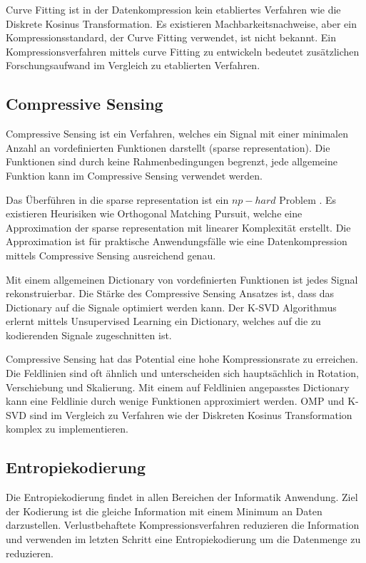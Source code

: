 Curve Fitting ist in der Datenkompression kein etabliertes Verfahren wie die Diskrete Kosinus Transformation. Es existieren Machbarkeitsnachweise, aber ein Kompressionsstandard, der Curve Fitting verwendet, ist nicht bekannt. Ein Kompressionsverfahren mittels curve Fitting zu entwickeln bedeutet zusätzlichen Forschungsaufwand im Vergleich zu etablierten Verfahren.

\subsection{Compressive Sensing}
Compressive Sensing ist ein Verfahren, welches ein Signal mit einer minimalen Anzahl an vordefinierten Funktionen darstellt (sparse representation). Die Funktionen sind durch keine Rahmenbedingungen begrenzt, jede allgemeine Funktion kann im Compressive Sensing verwendet werden. 

Das Überführen in die sparse representation ist ein $np-hard$ Problem \cite{wiki:npHard}. Es existieren Heurisiken wie Orthogonal Matching Pursuit\cite{tropp2007signal}, welche eine Approximation der sparse representation mit linearer Komplexität erstellt. Die Approximation ist für praktische Anwendungsfälle wie eine Datenkompression mittels Compressive Sensing ausreichend genau.

Mit einem allgemeinen Dictionary von vordefinierten Funktionen ist jedes Signal rekonstruierbar. Die Stärke des Compressive Sensing Ansatzes ist, dass das Dictionary auf die Signale optimiert werden kann. Der K-SVD \cite{bryt2008compression} Algorithmus erlernt mittels Unsupervised Learning ein Dictionary, welches auf die zu kodierenden Signale zugeschnitten ist. 

Compressive Sensing hat das Potential eine hohe Kompressionsrate zu erreichen. Die Feldlinien sind oft ähnlich und unterscheiden sich hauptsächlich in Rotation, Verschiebung und Skalierung. Mit einem auf Feldlinien angepasstes Dictionary kann eine Feldlinie durch wenige Funktionen approximiert werden. OMP und K-SVD sind im Vergleich zu Verfahren wie der Diskreten Kosinus Transformation komplex zu implementieren. 

\subsection{Entropiekodierung}
Die Entropiekodierung findet in allen Bereichen der Informatik Anwendung. Ziel der Kodierung ist die gleiche Information mit einem Minimum an Daten darzustellen. Verlustbehaftete Kompressionsverfahren reduzieren die Information und verwenden im letzten Schritt eine Entropiekodierung um die Datenmenge zu reduzieren.

